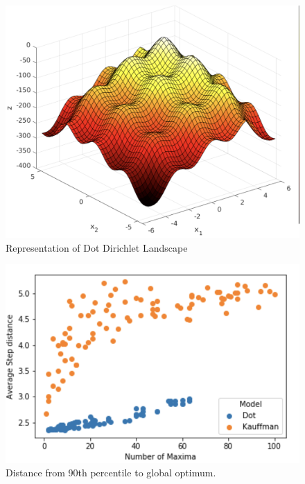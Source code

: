 \documentclass[11pt, oneside]{article}   	%
\begin{document}
\begin{figure}[h!]
  \caption{Representation of Dot Dirichlet Landscape}
  \includegraphics[width=.7\textwidth]{Egg_Crate_Smooth.png}
\end{figure}

\begin{figure}[h!]
  \caption{Distance from 90th percentile to global optimum.}
  \includegraphics[width=.7\textwidth]{90th_to_Global_Dist.png}
\end{figure}
\end{document}
